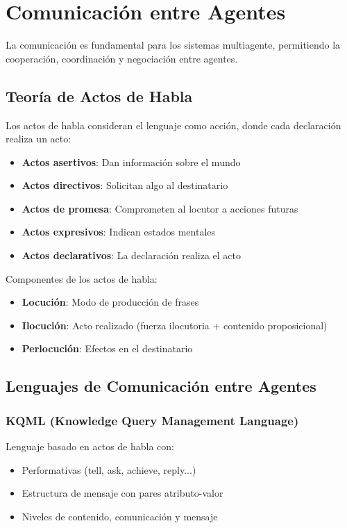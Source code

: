 \section{Comunicación entre Agentes}

La comunicación es fundamental para los sistemas multiagente, permitiendo la cooperación, coordinación y negociación entre agentes.

\subsection{Teoría de Actos de Habla}

Los actos de habla consideran el lenguaje como acción, donde cada declaración realiza un acto:
\begin{itemize}
    \item \textbf{Actos asertivos}: Dan información sobre el mundo
    \item \textbf{Actos directivos}: Solicitan algo al destinatario
    \item \textbf{Actos de promesa}: Comprometen al locutor a acciones futuras
    \item \textbf{Actos expresivos}: Indican estados mentales
    \item \textbf{Actos declarativos}: La declaración realiza el acto
\end{itemize}

Componentes de los actos de habla:
\begin{itemize}
    \item \textbf{Locución}: Modo de producción de frases
    \item \textbf{Ilocución}: Acto realizado (fuerza ilocutoria + contenido proposicional)
    \item \textbf{Perlocución}: Efectos en el destinatario
\end{itemize}

\subsection{Lenguajes de Comunicación entre Agentes}

\subsubsection{KQML (Knowledge Query Management Language)}
Lenguaje basado en actos de habla con:
\begin{itemize}
    \item Performativas (tell, ask, achieve, reply...)
    \item Estructura de mensaje con pares atributo-valor
    \item Niveles de contenido, comunicación y mensaje
\end{itemize}


